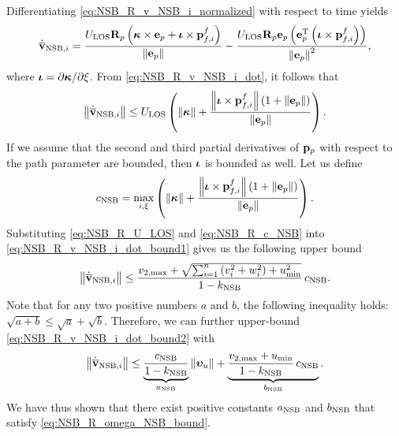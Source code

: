 Differentiating \eqref{eq:NSB_R_v_NSB_i_normalized} with respect to time yields
\begin{equation}
    \dot{\overline{\mathbf{v}}}_{{\rm NSB}, i} = 
    \frac{U_{\rm LOS}\mathbf{R}_p\left(\bm{\kappa}\times\mathbf{e}_p + \bm{\iota}\times\mathbf{p}_{f,i}^f\right)}{\left\|\mathbf{e}_p\right\|}
    - \frac{U_{\rm LOS}\mathbf{R}_p\mathbf{e}_p\left(\mathbf{e}_p^{\mathrm{T}}\left(\bm{\iota}\times\mathbf{p}_{f,i}^f\right)\right)}{\left\|\mathbf{e}_p\right\|^2},
    \label{eq:NSB_R_v_NSB_i_dot}
\end{equation}
where $\bm{\iota} = \partial \bm{\kappa} / \partial \xi$. From \eqref{eq:NSB_R_v_NSB_i_dot}, it follows that
\begin{equation}
    \left\|\dot{\overline{\mathbf{v}}}_{{\rm NSB}, i}\right\| \leq
    U_{\rm LOS} \left(\left\|\bm{\kappa}\right\| + \frac{\left\|\bm{\iota}\times\mathbf{p}_{f,i}^f\right\|\left(1 + \left\|\mathbf{e}_p\right\|\right)}{\left\|\mathbf{e}_p\right\|}\right).
    \label{eq:NSB_R_v_NSB_i_dot_bound1}
\end{equation}
If we assume that the second and third partial derivatives of $\mathbf{p}_p$ with respect to the path parameter are bounded, then $\bm{\iota}$ is bounded as well.
Let us define
\begin{equation}
    c_{\rm NSB} = \max_{i, \xi} \left(\left\|\bm{\kappa}\right\| + \frac{\left\|\bm{\iota}\times\mathbf{p}_{f,i}^f\right\|\left(1 + \left\|\mathbf{e}_p\right\|\right)}{\left\|\mathbf{e}_p\right\|}\right).
    \label{eq:NSB_R_c_NSB}
\end{equation}
Substituting \eqref{eq:NSB_R_U_LOS} and \eqref{eq:NSB_R_c_NSB} into \eqref{eq:NSB_R_v_NSB_i_dot_bound1} gives us the following upper bound
\begin{equation}
    \left\|\dot{\overline{\mathbf{v}}}_{{\rm NSB}, i}\right\| \leq 
    \frac{v_{2, \max} + \sqrt{\sum_{i=1}^n \left(v_i^2 + w_i^2\right) + u_{\min}^2}}{1 - k_{\rm NSB}}\,c_{\rm NSB}.
    \label{eq:NSB_R_v_NSB_i_dot_bound2}
\end{equation}
Note that for any two positive numbers $a$ and $b$, the following inequality holds: $\sqrt{a + b} \leq \sqrt{a} + \sqrt{b}$.
Therefore, we can further upper-bound \eqref{eq:NSB_R_v_NSB_i_dot_bound2} with
\begin{equation}
    \left\|\dot{\overline{\mathbf{v}}}_{{\rm NSB}, i}\right\| \leq 
    \underbrace{\frac{c_{\rm NSB}}{1 - k_{\rm NSB}}}_{a_{\rm NSB}}\left\|\bm{\upsilon}_u\right\| +
    \underbrace{\frac{v_{2, \max} + u_{\min}}{1 - k_{\rm NSB}}\,c_{\rm NSB}}_{b_{\rm NSB}}.
\end{equation}
We have thus shown that there exist positive constants $a_{\rm NSB}$ and $b_{\rm NSB}$ that satisfy \eqref{eq:NSB_R_omega_NSB_bound}.

